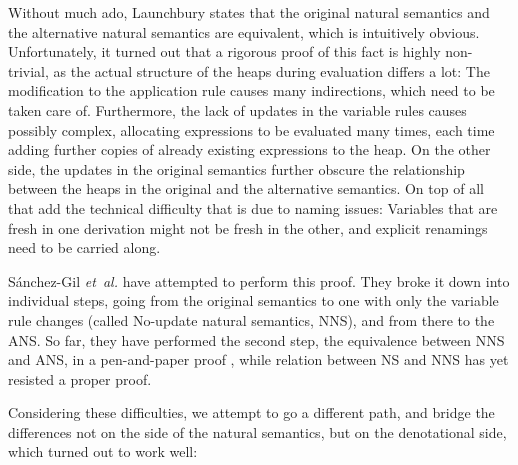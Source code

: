 \documentclass{jfp1}
\theoremstyle{nonumberbreak}
\begin{document}
Without much ado, Launchbury states that the original natural semantics and the alternative natural semantics are equivalent, which is intuitively obvious. Unfortunately, it turned out that a rigorous proof of this fact is highly non-trivial, as the actual structure of the heaps during evaluation differs a lot: The modification to the application rule causes many indirections, which need to be taken care of. Furthermore, the lack of updates in the variable rules causes possibly complex, allocating expressions to be evaluated many times, each time adding further copies of already existing expressions to the heap. On the other side, the updates in the original semantics further obscure the relationship between the heaps in the original and the alternative semantics. On top of all that add the technical difficulty that is due to naming issues: Variables that are fresh in one derivation might not be fresh in the other, and explicit renamings need to be carried along.

S{\'a}nchez-Gil {\em et~al.} have attempted to perform this proof. They broke it down into individual steps, going from the original semantics to one with only the variable rule changes (called No-update natural semantics, NNS), and from there to the ANS. So far, they have performed the second step, the equivalence between NNS and ANS, in a pen-and-paper proof , while relation between NS and NNS has yet resisted a proper proof.

Considering these difficulties, we attempt to go a different path, and bridge the differences not on the side of the natural semantics, but on the denotational side, which turned out to work well:
\end{document}
